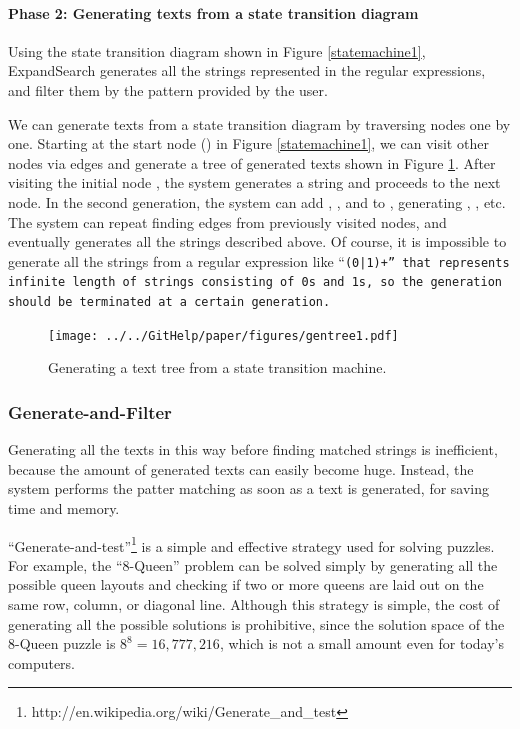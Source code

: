 \documentclass[manuscript,screen,review]{acmart}
\def\ES{\textsf{ExpandSearch}}
\begin{document}
\paragraph{Phase 2: Generating texts from a state transition diagram}

Using the state transition diagram shown in Figure \ref{statemachine1},
{\ES} generates all the strings represented in the regular expressions,
and filter them by the pattern provided by the user.

We can generate texts from a state transition diagram by traversing nodes one by one.
Starting at the start node
()
in Figure \ref{statemachine1},
we can visit other nodes via edges and generate a tree of generated texts
shown in Figure \ref{gentree1}.
After visiting the initial node
,
the system generates a string  and proceeds to the next node.
In the second generation,
the system can add , , and 
to , generating
, , etc.
The system can repeat finding edges from previously visited nodes,
and eventually generates all the strings described above.
Of course, it is impossible to generate all the strings
from a regular expression like ``\tt{(0|1)+}'' that represents infinite length of
strings consisting of \tt{0}s and \tt{1}s, so the generation should be
terminated at a certain generation.

\begin{figure}[htb]
\texttt{[image: ../../GitHelp/paper/figures/gentree1.pdf]}
\caption{Generating a text tree from a state transition machine.}
\label{gentree1}
\end{figure}

\subsubsection{Generate-and-Filter}

Generating all the texts in this way before finding matched strings is
inefficient, because the amount of generated texts can easily become huge.
Instead, the system performs the patter matching as soon as a text is generated,
for saving time and memory.

``Generate-and-test''\footnote{
  {\sf http:{\slash}{\slash}en.wikipedia.org{\slash}wiki{\slash}Generate\_and\_test}
}
is a simple and effective strategy used for solving puzzles.
For example,
the ``8-Queen'' problem can be solved simply by
generating all the possible queen layouts and checking if
two or more queens are laid out on the same row, column, or diagonal line.
Although this strategy is simple, the cost of
generating all the possible solutions is prohibitive, since
the solution space of the 8-Queen puzzle is $8^8 = 16,777,216$,
which is not a small amount even for today's computers.
\end{document}
